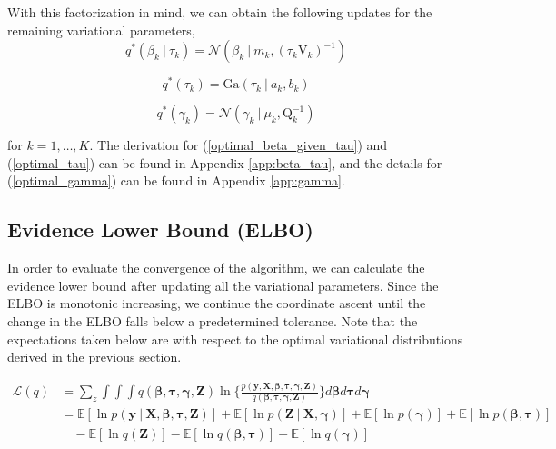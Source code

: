\documentclass[twoside,11pt]{article}
\newcommand\given[1][]{\:#1\vert\:}
\newcommand{\boldbeta}{\boldsymbol\beta}
\newcommand{\boldgamma}{\boldsymbol\gamma}
\newcommand{\boldtau}{\boldsymbol\tau}
\newcommand{\E}{\mathbb{E}}
\newcommand{\pr}[1]{p \left( #1 \right)}
\begin{document}
With this factorization in mind, we can obtain the following updates for the remaining variational parameters,
\begin{equation} \label{optimal_beta_given_tau}
	q^{*}(\beta_k \given \tau_k) = \mathcal{N}\left(\beta_k \given m_k, (\tau_k \mathrm{V}_k)^{-1} \right)
\end{equation}

\begin{equation} \label{optimal_tau}
	q^{*}(\tau_k) =  \mathrm{Ga}\left( \tau_k \given a_k, b_k \right)
\end{equation}

\begin{equation} \label{optimal_gamma}
	q^{*}(\gamma_k) = \mathcal{N} \left( \gamma_k \given \mu_k, \mathrm{Q}_k^{-1} \right)
\end{equation}

for $k = 1, \ldots, K$. The derivation for (\ref{optimal_beta_given_tau}) and (\ref{optimal_tau}) can be found in Appendix \ref{app:beta_tau}, and the details for (\ref{optimal_gamma}) can be found in Appendix \ref{app:gamma}.



\subsection{Evidence Lower Bound (ELBO)}
In order to evaluate the convergence of the algorithm, we can calculate the evidence lower bound after updating all the variational parameters. Since the ELBO is monotonic increasing, we continue the coordinate ascent until the change in the ELBO falls below a predetermined tolerance. Note that the expectations taken below are with respect to the optimal variational distributions derived in the previous section.

\begin{equation} \label{eq:ELBO}
\begin{split}
	\mathcal{L}(q) &= \sum_{z} \int \int \int q(\boldbeta, \boldtau, \boldgamma, \mathbf{Z})
	\ln \Big\{ \frac{p(\mathbf{y}, \mathbf{X}, \boldbeta, \boldtau, \boldgamma, \mathbf{Z})}{q(\boldbeta, \boldtau, \boldgamma, \mathbf{Z})}\Big\} d\boldbeta d\boldtau d\boldgamma \\
	&= \E[\ln\pr{\mathbf{y} \given \mathbf{X}, \boldbeta, \boldtau, \mathbf{Z}}] + 
	\E[\ln \pr{\mathbf{Z} \given \mathbf{X}, \boldgamma}] + \E[\ln \pr{\boldgamma}] + \E[\ln \pr{\boldbeta, \boldtau}] \\
	& \quad - \E[\ln q(\mathbf{Z})] - \E[\ln q(\boldbeta, \boldtau)] - \E[\ln q(\boldgamma)]
\end{split}
\end{equation}
\end{document}
